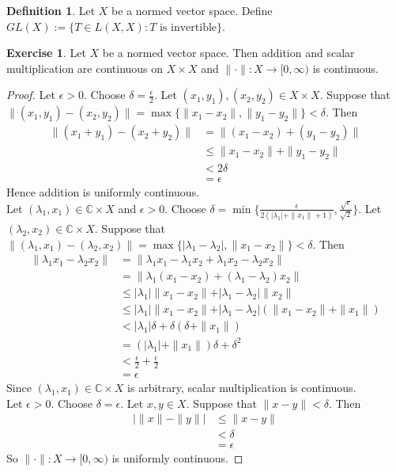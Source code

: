 \documentclass[12pt]{amsart}
\theoremstyle{definition}
\newtheorem{defn}[definition]{Definition}
\newtheorem{ex}[definition]{Exercise}
\newcommand{\del}{\delta}
\newcommand{\lam}{\lambda}
\newcommand{\ep}{\epsilon}
\newcommand{\C}{\mathbb{C}}
\newcommand{\Rg}{[0,\infty)}
\begin{document}
	\begin{defn}
		Let $X$ be a normed vector space. Define $GL(X) := \{T \in L(X,X): T \text{ is invertible}\}$.
	\end{defn}
	
	\begin{ex}
		Let $X$ be a normed vector space. Then addition and scalar multiplication are continuous on $X \times X$ and $\|\cdot \|:X \rightarrow \Rg$ is continuous.
	\end{ex}
	
	\begin{proof}
		Let $\ep > 0$. Choose $\del = \frac{\ep}{2}$. Let $(x_1,y_1), (x_2,y_2) \in X \times X$. Suppose that $\|(x_1,y_1)-(x_2,y_2) \| = \max\{\|x_1-x_2 \|, \|y_1 - y_2 \|\} < \del$. Then 
		\begin{align*}
			\|(x_1 + y_1) - (x_2+y_2) \|
			&= \|(x_1-x_2) + (y_1-y_2) \|\\
			& \leq \| x_1-x_2 \|+ \|y_1-y_2 \|\\
			& < 2\del \\
			&= \ep
		\end{align*} 
		Hence addition is uniformly continuous. \vspace{1cm}\\ Let $(\lam_1,x_1) \in \C \times X$ and $\ep >0$. Choose $\del = \min\{\frac{\ep}{2(\vert \lam_1 \vert + \|x_1 \|+ 1)}, \frac{\sqrt{\ep}}{\sqrt{2}}\}$. Let $(\lam_2, x_2) \in \C \times X$. Suppose that $\|(\lam_1, x_1)-(\lam_2,x_2) \| = \max\{\vert \lam_1-\lam_2 \vert , \|x_1 - x_2 \|\} < \del$. Then 
		\begin{align*}
			\|\lam_1x_1 - \lam_2x_2 \|
			&= \|\lam_1x_1 - \lam_1x_2 + \lam_1x_2- \lam_2x_2 \|\\
			&= \|\lam_1(x_1-x_2) + (\lam_1-\lam_2)x_2 \|\\
			& \leq \vert \lam_1 \vert \| x_1-x_2 \|+ \vert \lam_1-\lam_2 \vert \|x_2\|\\
			& \leq \vert \lam_1 \vert  \| x_1-x_2 \|+ \vert \lam_1-\lam_2 \vert (\|x_1 -x_2\|+ \|x_1\|)\\
			& < \vert \lam_1 \vert \del  +  \del( \del + \|x_1 \|)\\
			&= (\vert \lam_1 \vert + \|x_1 \|) \del + \del^2 \\
			&< \frac{\ep}{2}+ \frac{\ep}{2}\\
			&= \ep
		\end{align*}
		Since $(\lam_1, x_1) \in \C \times X$ is arbitrary, scalar multiplication is continuous. \vspace{1cm} \\ Let $\ep > 0$. Choose $\del = \ep$. Let $x,y \in X$. Suppose that $\|x-y \|< \del$. Then 
		\begin{align*}
			\big \vert \|x \|- \|y \|\big  \vert
			& \leq \|x - y \|\\
			&< \del\\
			&=\ep
		\end{align*}  
		So $\|\cdot \|: X \rightarrow \Rg$ is uniformly continuous.
	\end{proof}
	
\end{document}

